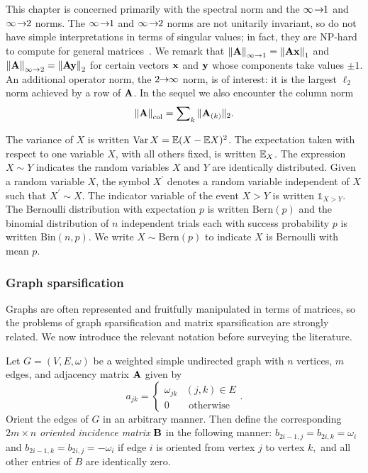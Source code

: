 This chapter is concerned primarily with the spectral norm and the $\infty\!\rightarrow\!\!1$ and
$\infty\!\rightarrow\!\!2$ norms. The $\infty\!\rightarrow\!\!1$ and $\infty\!\rightarrow\!\!2$ norms are not unitarily invariant, so 
do not have simple interpretations in terms of singular values; in fact, they are
\textsc{NP}-hard to compute for general matrices~\cite{Rohn00}. 
We remark that $\left\|\mathbf{A}\right\|_{\infty\rightarrow 1}=\left\|\mathbf{A}\mathbf{x}\right\|_{1}$ and
$\left\|\mathbf{A}\right\|_{\infty\rightarrow 2}=\left\|\mathbf{A}\mathbf{y}\right\|_{2}$ for certain vectors $\mathbf{x}$ and
$\mathbf{y}$ whose components take values $\pm1$. An additional operator norm, the $2\!\!\rightarrow\!\!\infty$ norm, is of interest: it is the
largest $\ell_{2}$ norm achieved by a row of $\mathbf{A}$. In the sequel we
also encounter the column norm 
\[
\left\|\mathbf{A}\right\|_{\mathrm{col}}=\sum\nolimits_k\|\mathbf{A}_{(k)}\|_{2}.
\]

The variance of $X$ is written $\operatorname{Var}{X} = \mathbb{E}(X-\mathbb{E} X)^2$. The expectation taken with respect to one
variable $X$, with all others fixed, is written $\mathbb{E}_X$. 
The expression $X \sim Y$ indicates the random variables $X$ and $Y$ are
identically distributed. Given a random variable $X$, the symbol $X^\prime$
denotes a random variable independent of $X$ such that $X^\prime \sim X$. The
indicator variable of the event $X > Y$ is written $\mathds{1}_{X > Y}$.
The Bernoulli distribution with expectation $p$ is written $\text{Bern}(p)$ and
the binomial distribution of $n$ independent trials each with success
probability $p$ is written $\text{Bin}(n,p)$. We write $X \sim \text{Bern}(p)$
to indicate $X$ is Bernoulli with mean $p.$

\subsubsection{Graph sparsification}

Graphs are often represented and fruitfully manipulated in terms of matrices,
so the problems of graph sparsification and matrix sparsification are strongly related.
We now introduce the relevant notation before surveying the literature.

Let $G=(V,E,\omega)$ be a weighted simple undirected graph with $n$ vertices, $m$ edges,
and adjacency matrix $\mathbf{A}$ given by
\[
 a_{jk} = \begin{cases} 
           \omega_{jk} & (j,k) \in E \\
           0 & \text{ otherwise}
          \end{cases}.
\]
Orient the edges of $G$ in an arbitrary manner. Then define the corresponding
$2m \times n$  \emph{oriented incidence matrix} $\mathbf{B}$ in the following manner: 
$b_{2i-1,j} = b_{2i, k} = \omega_i$ and $b_{2i-1,k} = b_{2i, j} = -\omega_i$ if 
edge $i$ is oriented from vertex $j$ to vertex $k,$ and all other entries of 
$B$ are identically zero.

